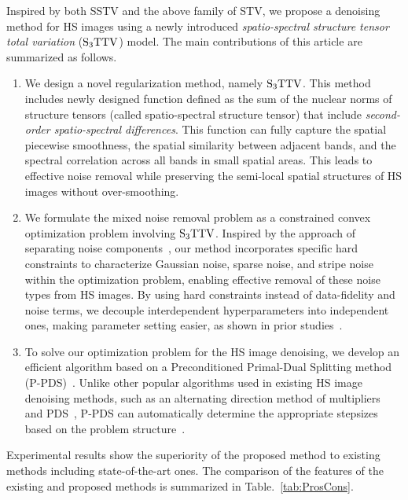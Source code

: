 Inspired by both SSTV and the above family of STV, we propose a denoising method for HS images using a newly introduced \textit{spatio-spectral structure tensor total variation} (${\text{S}_{3} \text{TTV}}$) model.
The main contributions of this article are summarized as follows.
\begin{enumerate}
	\item We design a novel regularization method, namely ${\text{S}_{3} \text{TTV}}$. 
	This method includes newly designed function defined as the sum of the nuclear norms of structure tensors (called spatio-spectral structure tensor) that include \textit{second-order spatio-spectral differences}. 
	This function can fully capture the spatial piecewise smoothness, the spatial similarity between adjacent bands, and the spectral correlation across all bands in small spatial areas. This leads to effective noise removal while preserving the semi-local spatial structures of HS images without over-smoothing.
	
	\item We formulate the mixed noise removal problem as a constrained convex optimization problem involving ${\text{S}_{3} \text{TTV}}$. 
	Inspired by the approach of separating noise components~\cite{Zhang2022Double}, our method incorporates specific hard constraints to characterize Gaussian noise, sparse noise, and stripe noise within the optimization problem, enabling effective removal of these noise types from HS images. 
	By using hard constraints instead of data-fidelity and noise terms, we decouple interdependent hyperparameters into independent ones, making parameter setting easier, as shown in prior studies~\cite{Afonso2011Constraint, Chierchia2015Constraint, Ono2015Constraint, Ono2017Constraint, Ono2019Constraint, Naganuma2022Destriping}.

	
	\item To solve our optimization problem for the HS image denoising, we develop an efficient algorithm based on a Preconditioned Primal-Dual Splitting method (P-PDS)~\cite{Pock2011PPDS}. 
	Unlike other popular algorithms used in existing HS image denoising methods, such as an alternating direction method of multipliers~\cite{Boyd2011ADMM} and PDS~\cite{Chambolle2011PDS, Condat2013PDS}, P-PDS can automatically determine the appropriate stepsizes based on the problem structure~\cite{Pock2011PPDS,Naganuma2023PPDS}. 
	
\end{enumerate}
Experimental results show the superiority of the proposed method to existing methods including state-of-the-art ones.
The comparison of the features of the existing and proposed methods is summarized in Table.~\ref{tab:ProsCons}.

